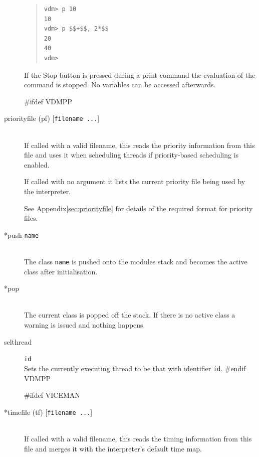\documentclass[\pformat,12pt]{article}
\newcommand{\guicmd}[1]{{\sf #1}}
\newcommand{\guicmd}[1]{{\gt #1}}
\begin{document}
\begin{description}
\begin{quote}
\begin{verbatim}
vdm> p 10
10
vdm> p $$+$$, 2*$$
20
40
vdm> 
\end{verbatim}
\end{quote}

  If the \guicmd{Stop} button
  is pressed during a 
  print command the evaluation of the command is stopped. No variables
  can be accessed afterwards.
  
#ifdef VDMPP
\item[priorityfile (pf) \mbox{[{\tt filename ...}]}]
  \mbox{}\\
  If called with a valid filename, this reads the priority information
  from this file and uses it when scheduling threads if
  priority-based scheduling is enabled.

  If called with no argument it lists the current priority file being
  used by the interpreter.

  See Appendix\ref{sec:priorityfile} for details of the required
  format for priority files.

\item[*push {\tt name}] \mbox{}\\
  The class {\tt name}\/ is pushed onto the modules stack and becomes
  the active class after initialisation.
  
\item[*pop] \mbox{}\\
  The current class is popped off the stack. 
If there is no active class a warning is issued and
  nothing happens.

\item[selthread]\texttt{id}\mbox{}\\
  Sets the currently executing thread to be that with identifier
  \texttt{id}.
#endif VDMPP

#ifdef VICEMAN
\item[*timefile (tf) \mbox{[{\tt filename ...}]}] \mbox{}\\
  If called with a valid filename, this reads the timing information
  from this file and merges it with the interpreter's default time
  map.


\end{description}
\end{document}
